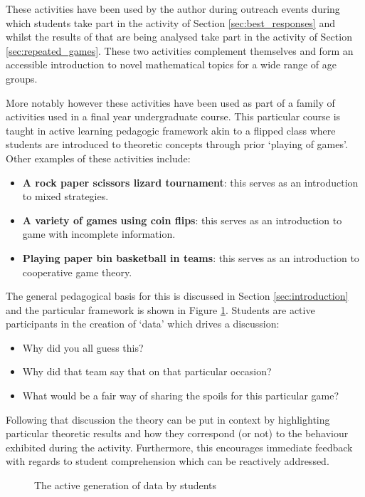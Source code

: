 \documentclass[12pt, a4paper]{article}
\begin{document}
These activities have been used by the author during outreach events during
which students take part in the activity of Section \ref{sec:best_responses} and
whilst the results of that are being analysed take part in the activity of
Section \ref{sec:repeated_games}. These two activities complement themselves and
form an accessible introduction to novel mathematical topics for a wide range of
age groups.

More notably however these activities have been used as part of a family of
activities used in a final year undergraduate course. This particular course is
taught in active learning pedagogic framework akin to a flipped class where
students are introduced to theoretic concepts through prior `playing of games'.
Other examples of these activities include:

\begin{itemize}
    \item \textbf{A rock paper scissors lizard tournament}: this serves as an
        introduction to mixed strategies.
    \item \textbf{A variety of games using coin flips}: this serves as an
        introduction to game with incomplete information.
    \item \textbf{Playing paper bin basketball in teams}: this serves as an
        introduction to cooperative game theory.
\end{itemize}

The general pedagogical basis for this is discussed in Section
\ref{sec:introduction} and the particular framework is shown in Figure
\ref{fig:use_of_data}. Students are active participants in the creation of
`data' which drives a discussion:

\begin{itemize}
    \item Why did you all guess this?
    \item Why did that team say that on that particular occasion?
    \item What would be a fair way of sharing the spoils for this particular
        game?
\end{itemize}

Following that discussion the theory can be put in context by highlighting
particular theoretic results and how they correspond (or not) to the behaviour
exhibited during the activity. Furthermore, this encourages immediate
feedback with regards to student comprehension which can be reactively
addressed.

\begin{figure}[!hbtp]
    \centering
    
    \caption{The active generation of data by students}
    \label{fig:use_of_data}
\end{figure}
\end{document}
